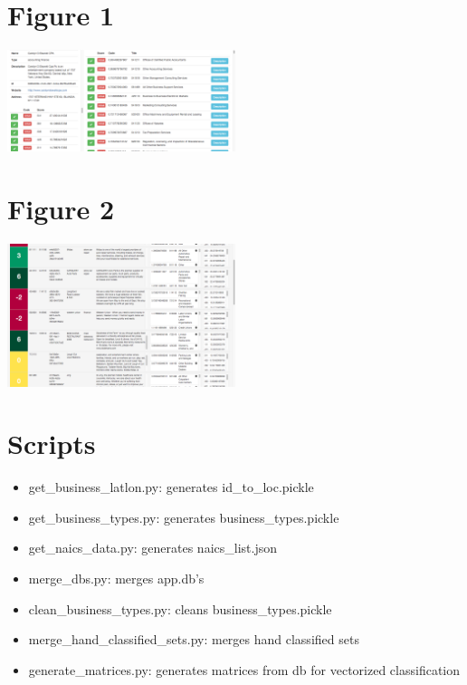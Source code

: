 \documentclass[letterpaper, 9 pt, conference]{IEEEtran}
\begin{document}
\appendix
\section*{Figure 1}
\includegraphics[width=0.5\textwidth]{handclassifier.png}

\section*{Figure 2}
\includegraphics[width=0.5\textwidth]{database.png}

\section*{Scripts}
\begin{itemize}
\item get\_business\_latlon.py: generates id\_to\_loc.pickle
\item get\_business\_types.py: generates business\_types.pickle
\item get\_naics\_data.py: generates naics\_list.json
\item merge\_dbs.py: merges app.db's
\item clean\_business\_types.py: cleans business\_types.pickle
\item merge\_hand\_classified\_sets.py: merges hand classified sets
\item generate\_matrices.py: generates matrices from db for vectorized classification
\end{itemize}
\fi
\end{document}

